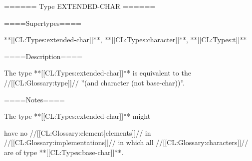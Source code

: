 ====== Type EXTENDED-CHAR ======

====Supertypes====

**[[CL:Types:extended-char]]**, **[[CL:Types:character]]**, **[[CL:Types:t]]**

====Description====

The type **[[CL:Types:extended-char]]** is equivalent to the //[[CL:Glossary:type]]// ''(and character (not base-char))''.

====Notes====

The type **[[CL:Types:extended-char]]** might

have no //[[CL:Glossary:element|elements]]// in //[[CL:Glossary:implementations]]// in which all //[[CL:Glossary:characters]]// are of type **[[CL:Types:base-char]]**.

 
